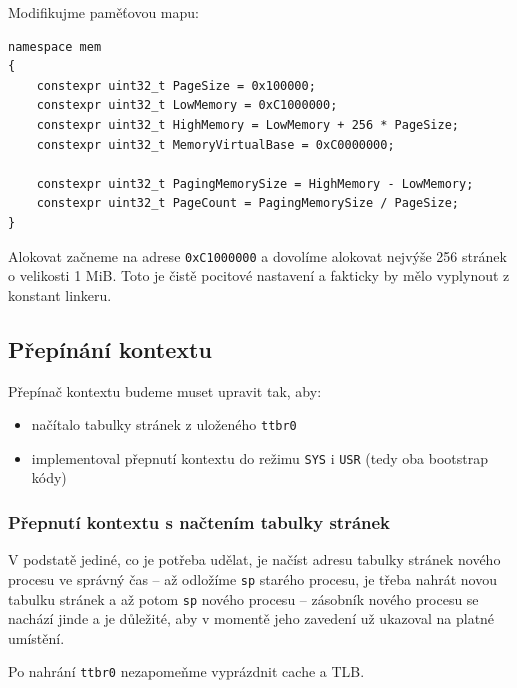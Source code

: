 \documentclass{article}
\begin{document}
Modifikujme paměťovou mapu:
\begin{lstlisting}
namespace mem
{
	constexpr uint32_t PageSize = 0x100000;
	constexpr uint32_t LowMemory = 0xC1000000;
	constexpr uint32_t HighMemory = LowMemory + 256 * PageSize;
	constexpr uint32_t MemoryVirtualBase = 0xC0000000;

	constexpr uint32_t PagingMemorySize = HighMemory - LowMemory;
	constexpr uint32_t PageCount = PagingMemorySize / PageSize;
}
\end{lstlisting}

Alokovat začneme na adrese \texttt{0xC1000000} a dovolíme alokovat nejvýše 256 stránek o velikosti 1 MiB. Toto je čistě pocitové nastavení a fakticky by mělo vyplynout z konstant linkeru.

\subsection{Přepínání kontextu}

Přepínač kontextu budeme muset upravit tak, aby:
\begin{itemize}
	\item načítalo tabulky stránek z uloženého {\tt ttbr0}
	\item implementoval přepnutí kontextu do režimu {\tt SYS} i {\tt USR} (tedy oba bootstrap kódy)
\end{itemize}

\subsubsection{Přepnutí kontextu s načtením tabulky stránek}

V podstatě jediné, co je potřeba udělat, je načíst adresu tabulky stránek nového procesu ve správný čas -- až odložíme {\tt sp} starého procesu, je třeba nahrát novou tabulku stránek a až potom {\tt sp} nového procesu -- zásobník nového procesu se nachází jinde a je důležité, aby v momentě jeho zavedení už ukazoval na platné umístění.

Po nahrání {\tt ttbr0} nezapomeňme vyprázdnit cache a TLB.
\end{document}

